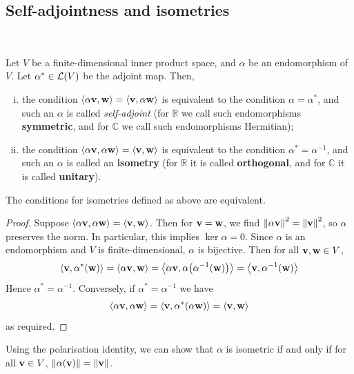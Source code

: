 \documentclass[a4paper]{article}
\begin{document}
\subsection{Self-adjointness and isometries}
\ \vspace*{-1.5em}
\begin{definition}
	Let \( V \) be a finite-dimensional inner product space, and \( \alpha \) be an endomorphism of \( V \).
	Let \( \alpha^* \in {\mathcal{L}}(V) \) be the adjoint map.
	Then,
	\begin{enumerate}[(i)]
		\item the condition \( \left\langle{\alpha {\bf v}, {\bf w}}\right\rangle = \left\langle{{\bf v}, \alpha {\bf w}}\right\rangle \) is equivalent to the condition \( \alpha = \alpha^* \), and such an \( \alpha \) is called \textit{self-adjoint} (for \( \mathbb R \) we call such endomorphisms \textbf{symmetric}, and for \( \mathbb C \) we call such endomorphisms Hermitian);
		\item the condition \( \left\langle{\alpha {\bf v}, \alpha {\bf w}}\right\rangle = \left\langle{{\bf v}, {\bf w}}\right\rangle \) is equivalent to the condition \( \alpha^* = \alpha^{-1} \), and such an \( \alpha \) is called an \textbf{isometry} (for \( \mathbb R \) it is called \textbf{orthogonal}, and for \( \mathbb C \) it is called \textbf{unitary}).
	\end{enumerate}
\end{definition}
\begin{proposition}
	The conditions for isometries defined as above are equivalent.
\end{proposition}
\begin{proof}
	Suppose \( \left\langle{\alpha {\bf v}, \alpha {\bf w}}\right\rangle = \left\langle{{\bf v},{\bf w}}\right\rangle \).
	Then for \( {\bf v} = {\bf w} \), we find \( \norm{\alpha {\bf v}}^2 = \norm{{\bf v}}^2 \), so \( \alpha \) preserves the norm.
	In particular, this implies \( \ker \alpha = \qty{0} \).
	Since \( \alpha \) is an endomorphism and \( V \) is finite-dimensional, \( \alpha \) is bijective.
	Then for all \( {\bf v}, {\bf w} \in V \),
	\[
		\left\langle{{\bf v}, \alpha^*({\bf w})}\right\rangle = \left\langle{\alpha {\bf v}, {\bf w}}\right\rangle = \left\langle{\alpha {\bf v}, \alpha\qty(\alpha^{-1}({\bf w}))}\right\rangle = \left\langle{{\bf v}, \alpha^{-1}({\bf w})}\right\rangle
	\]
	Hence \( \alpha^* = \alpha^{-1} \).
	Conversely, if \( \alpha^* = \alpha^{-1} \) we have
	\[
		\left\langle{\alpha {\bf v}, \alpha {\bf w}}\right\rangle = \left\langle{{\bf v}, \alpha^*(\alpha {\bf w})}\right\rangle = \left\langle{{\bf v}, {\bf w}}\right\rangle
	\]
	as required.
\end{proof}
\begin{remark}
	Using the polarisation identity, we can show that \( \alpha \) is isometric if and only if for all \( {\bf v} \in V \), \( \norm{\alpha({\bf v})} = \norm{{\bf v}} \).
\end{remark}
\end{document}
